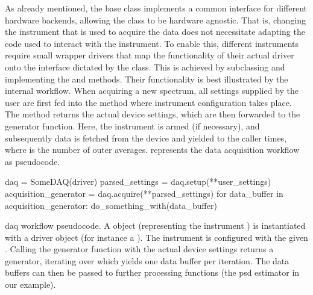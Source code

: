 As already mentioned, the  base class implements a common interface for different hardware backends, allowing the  class to be hardware agnostic.
That is, changing the instrument that is used to acquire the data does not necessitate adapting the code used to interact with the instrument.
To enable this, different instruments require small wrapper drivers that map the functionality of their actual driver onto the interface dictated by the  class.
This is achieved by subclassing  and implementing the  and  methods.
Their functionality is best illustrated by the internal workflow.
When acquiring a new spectrum, all settings supplied by the user are first fed into the  method where instrument configuration takes place.
The method returns the actual device settings,
which are then forwarded to the  generator function.
Here, the instrument is armed (if necessary), and subsequently data is fetched from the device and yielded to the caller  times, where  is the number of outer averages.
 represents the data acquisition workflow as pseudocode.

\begin{listing}
    \begin{py}
        daq = SomeDAQ(driver)
        parsed_settings = daq.setup(**user_settings)
        acquisition_generator = daq.acquire(**parsed_settings)
        for data_buffer in acquisition_generator:
            do_something_with(data_buffer)
    \end{py}
    \caption[\gls{daq} workflow pseudocode]{
        \gls{daq} workflow pseudocode.
        A  object (representing the instrument ) is instantiated with a driver object (for instance a \qcodes {}).
        The instrument is configured with the given .
        Calling the generator function  with the actual device settings returns a generator, iterating over which yields one data buffer per iteration.
        The data buffers can then be passed to further processing functions (the \gls{psd} estimator in our example).
    }
    \label{lst:speck:daq_workflow}
\end{listing}

